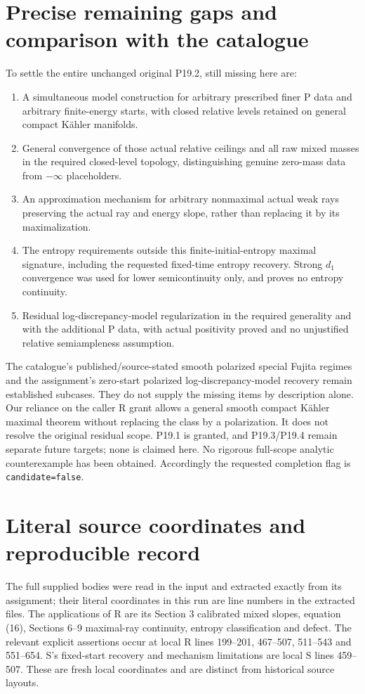 \documentclass[11pt]{article}
\begin{document}
\section{Precise remaining gaps and comparison with the catalogue}
To settle the entire unchanged original P19.2, still missing here are:
\begin{enumerate}
\item A simultaneous model construction for arbitrary prescribed
finer P data and arbitrary finite-energy starts, with closed
relative levels retained on general compact K\"ahler manifolds.
\item General convergence of those actual relative ceilings and
all raw mixed masses in the required closed-level topology,
distinguishing genuine zero-mass data from $-\infty$ placeholders.
\item An approximation mechanism for arbitrary nonmaximal actual
weak rays preserving the actual ray and energy slope, rather than
replacing it by its maximalization.
\item The entropy requirements outside this finite-initial-entropy
maximal signature, including the requested fixed-time entropy
recovery. Strong $d_1$ convergence was used for lower
semicontinuity only, and proves no entropy continuity.
\item Residual log-discrepancy-model regularization in the required
generality and with the additional P data, with actual positivity
proved and no unjustified relative semiampleness assumption.
\end{enumerate}
The catalogue's published/source-stated smooth polarized special
Fujita regimes and the assignment's zero-start polarized
log-discrepancy-model recovery remain established subcases.
They do not supply the missing items by description alone.
Our reliance on the caller R grant allows a general smooth compact
K\"ahler maximal theorem without replacing the class by a polarization.
It does not resolve the original residual scope. P19.1 is granted,
and P19.3/P19.4 remain separate future targets; none is claimed here.
No rigorous full-scope analytic counterexample has been obtained.
Accordingly the requested completion flag is \texttt{candidate=false}.

\appendix
\section{Literal source coordinates and reproducible record}
The full supplied bodies were read in the input and extracted exactly
from its assignment; their literal coordinates in this run are
line numbers in the extracted files. The applications of R are
its Section 3 calibrated mixed slopes, equation (16), Sections 6--9
maximal-ray continuity, entropy classification and defect.
The relevant explicit assertions occur at local R lines 199--201,
467--507, 511--543 and 551--654. S's fixed-start recovery and
mechanism limitations are local S lines 459--507. These are fresh
local coordinates and are distinct from historical source layouts.
\end{document}
